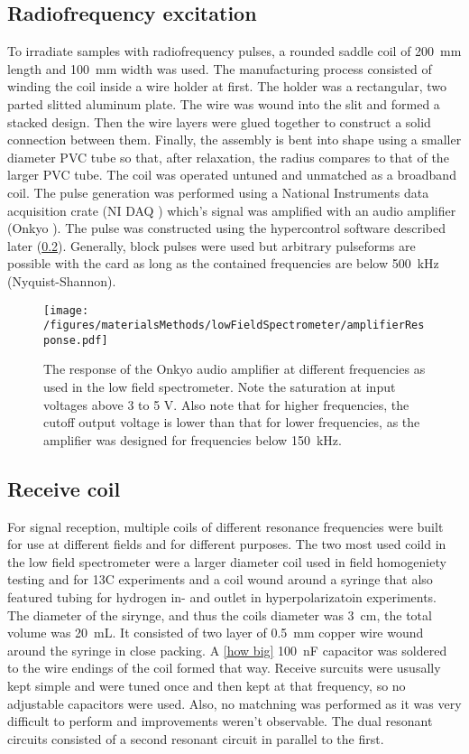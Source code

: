         \subsection{Radiofrequency excitation}
            To irradiate samples with radiofrequency pulses, a rounded saddle coil of \SI{200}{\mm} length and \SI{100}{\mm} width was used. The manufacturing process consisted of winding the coil inside a wire holder at first. The holder was a rectangular, two parted slitted aluminum plate. The wire was wound into the slit and formed a stacked design. Then the wire layers were glued together to construct a solid connection between them.  Finally, the assembly is bent into shape using a smaller diameter PVC tube so that, after relaxation, the radius compares to that of the larger PVC tube. The coil was operated untuned and unmatched as a broadband coil. The pulse generation was performed using a National Instruments data acquisition crate (NI DAQ ) which's signal was amplified with an audio amplifier (Onkyo ).
            The pulse was constructed using the hypercontrol software described later (\ref{}). Generally, block pulses were used but arbitrary pulseforms are possible with the card as long as the contained frequencies are below \SI{500}{\kilo\hertz} (Nyquist-Shannon). 
            \begin{figure}
                \centering
                \texttt{[image: /figures/materialsMethods/lowFieldSpectrometer/amplifierResponse.pdf]}
                \caption[Amplifier response]{The response of the Onkyo audio amplifier at different frequencies as used in the low field spectrometer. Note the saturation at input voltages above 3 to 5 \si{\volt}. Also note that for higher frequencies, the cutoff output voltage is lower than that for lower frequencies, as the amplifier was designed for frequencies below \SI{150}{\kilo\hertz}. }
            \end{figure}
        \subsection{Receive coil}
        For signal reception, multiple coils of different resonance frequencies were built for use at different fields and for different purposes. The two most used coild in the low field spectrometer were a larger diameter coil used in field homogeniety testing and for 13C experiments and a coil wound around a syringe that also featured tubing for hydrogen in- and outlet in hyperpolarizatoin experiments. The diameter of the sirynge, and thus the coils diameter was \SI{3}{\cm}, the total volume was \SI{20}{\milli\liter}. It consisted of two layer of \SI{0.5}{\milli\meter} copper wire wound around the syringe in close packing. A \ref{how big} \SI{100}{\nano\farad} capacitor was soldered to the wire endings of the coil formed that way. 
        Receive surcuits were ususally kept simple and were tuned once and then kept at that frequency, so no adjustable capacitors were used. Also, no matchning was performed as it was very difficult to perform and improvements weren't observable. The dual resonant circuits consisted of a second resonant circuit in parallel to the first.

